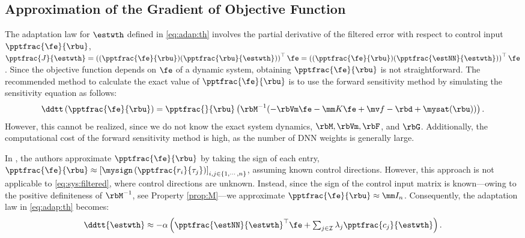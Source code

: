 \documentclass[letterpaper, journal]{IEEEtran}
\begin{document}
\subsection{Approximation of the Gradient of Objective Function}

The adaptation law for $\estwth$ defined in \eqref{eq:adap:th} involves the partial derivative of the filtered error with respect to control input $\pptfrac{\fe}{\rbu}$, \ie 
$
    \pptfrac{J}{\estwth}
    =
    \left(
        (\pptfrac{\fe}{\rbu})
        (\pptfrac{\rbu}{\estwth})
    \right)
    ^\top \fe
    =
    \left(
        (\pptfrac{\fe}{\rbu})
        (\pptfrac{\estNN}{\estwth})
    \right)
    ^\top \fe
$. 
Since the objective function depends on $\fe$ of a dynamic system, obtaining $\pptfrac{\fe}{\rbu}$ is not straightforward. 
The recommended method to calculate the exact value of $\pptfrac{\fe}{\rbu}$ is to use the forward sensitivity method \cite{Sengupta:2014aa,Ryu:2024aa} by simulating the sensitivity equation as follows: 
\begin{equation}
    \ddtt 
    \left(
        \pptfrac{\fe}{\rbu}
    \right)
    =
    \pptfrac{}{
        \rbu
    }
    \left(
        \rbM^{-1}(
            -\rbVm \fe
            -\mm K \fe
            + \mv f
            -\rbd + \mysat(\rbu)
        )
    \right)
    .
\end{equation}
However, this cannot be realized, since we do not know the exact system dynamics, \ie $\rbM,\rbVm, \rbF$, and $\rbG$.
Additionally, the computational cost of the forward sensitivity method is high, as the number of DNN weights is generally large.

In \cite{Douratsos:2007aa,Saerens:1991aa}, the authors approximate $\pptfrac{\fe}{\rbu}$ by taking the sign of each entry, \ie
$
    \pptfrac{\fe}{\rbu}
    \approx
    \left[
        \mysign
        \left(
            \pptfrac{r_i}{\tau_j}
        \right)
    \right]_{i,j\in\{1,\cdots,n\}}
$, 
assuming known control directions.
However, this approach is not applicable to \eqref{eq:sys:filtered}, where control directions are unknown.
Instead, since the sign of the control input matrix is known—owing to the positive definiteness of $\rbM^{-1}$, see Property \ref{prop:M}—we approximate $\pptfrac{\fe}{\rbu}\approx \mm I_n$.
Consequently, the adaptation law in \eqref{eq:adap:th} becomes:
\begin{equation}
    \ddtt{\estwth}
    \approx
    -\alpha 
    \left(
        {\pptfrac{\estNN}
        {\estwth}}^\top
        \fe
        +
        \textstyle\sum_{j\in\mathcal{I}}
        \lambda_j 
        \pptfrac{c_j}{\estwth}
    \right)
    .
    \label{eq:adap:th:approx}
\end{equation}
\end{document}
